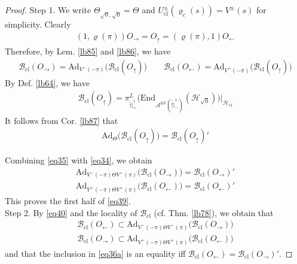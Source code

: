 \documentclass[11pt,b5paper,notitlepage]{article}
\theoremstyle{definition}
\theoremstyle{plain}
\newcommand{\ovl}{\overline}
\newcommand{\End}{\mathrm{End}} %
\newcommand{\Ad}{\mathrm{Ad}}
\newcommand{\MH}{\mathcal H}
\newcommand{\Maa}{{\mathcal A^{\otimes 2}}}
\newcommand{\sqz}{{\sqrt 0}}
\newcommand{\MHcl}{\mathcal H_{\mathrm{cl}}}
\newcommand{\Bcl}{\mathcal B_{\mathrm{cl}}}
\newcommand{\Ucl}{U_{\mathrm{cl}}}
\newcommand{\Std}{\widetilde {\mathbb S}^1}
\numberwithin{equation}{section}
\begin{document}
\begin{proof}
Step 1. We write $\Theta_{\sqz,\ovl{\sqz}}=\Theta$ and $\Ucl^\pm(\varrho_c(s))=V^\pm(s)$ for simplicity. Clearly
\begin{align*}
(1,\varrho(\pi))O_\rightarrow=O_\uparrow=(\varrho(\pi),1)O_\leftarrow
\end{align*}
Therefore, by Lem. \ref{lb85} and \ref{lb86}, we have
\begin{align}\label{eq34}
\Bcl(O_\rightarrow)=\Ad_{V^-(-\pi)}\big(\Bcl(O_\uparrow)\big)\qquad \Bcl(O_\leftarrow)=\Ad_{V^+(-\pi)}\big(\Bcl(O_\uparrow)\big)
\end{align}
By Def. \ref{lb64}, we have
\begin{align*}
\Bcl(O_\uparrow)=\pi^L_{\Std_+}\big(\End_{\Maa(\Std_-)}(\MH_\sqz)\big)\big|_{\MHcl}
\end{align*}
It follows from Cor. \ref{lb87} that
\begin{align}\label{eq35}
\Ad_\Theta\big(\Bcl(O_\uparrow)\big)=\Bcl(O_\uparrow)'
\end{align}


Combining \eqref{eq35} with \eqref{eq34}, we obtain
\begin{subequations}\label{eq40}
\begin{gather}
\Ad_{V^-(-\pi)\Theta V^-(\pi)}\big(\Bcl(O_\rightarrow)\big)=\Bcl(O_\rightarrow)'\\
\Ad_{V^+(-\pi)\Theta V^+(\pi)}\big(\Bcl(O_\leftarrow)\big)=\Bcl(O_\leftarrow)'
\end{gather}
\end{subequations}
This proves the first half of \eqref{eq39}. \\[-1ex]


Step 2. By \eqref{eq40} and the locality of $\Bcl$ (cf. Thm. \ref{lb78}), we obtain that
\begin{subequations}\label{eq36}
\begin{gather}
\Bcl(O_\leftarrow)\subset \Ad_{V^-(-\pi)\Theta V^-(\pi)}\big(\Bcl(O_\rightarrow)\big)\label{eq36a}\\
\Bcl(O_\rightarrow)\subset \Ad_{V^+(-\pi)\Theta V^+(\pi)}\big(\Bcl(O_\leftarrow)\big)\label{eq36b}
\end{gather}
\end{subequations}
and that the inclusion in \eqref{eq36a} is an equality iff $\Bcl(O_\leftarrow)=\Bcl(O_\rightarrow)'$.


\end{proof}
\end{document}
